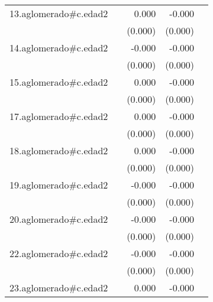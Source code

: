 {\begin{longtable}{l*{4}{D{.}{.}{-1}}}
\addlinespace
13.aglomerado#c.edad2&                     &       0.000         &      -0.000         &                     \\
            &                     &     (0.000)         &     (0.000)         &                     \\
\addlinespace
14.aglomerado#c.edad2&                     &      -0.000         &      -0.000\sym{**} &                     \\
            &                     &     (0.000)         &     (0.000)         &                     \\
\addlinespace
15.aglomerado#c.edad2&                     &       0.000         &      -0.000         &                     \\
            &                     &     (0.000)         &     (0.000)         &                     \\
\addlinespace
17.aglomerado#c.edad2&                     &       0.000         &      -0.000         &                     \\
            &                     &     (0.000)         &     (0.000)         &                     \\
\addlinespace
18.aglomerado#c.edad2&                     &       0.000         &      -0.000         &                     \\
            &                     &     (0.000)         &     (0.000)         &                     \\
\addlinespace
19.aglomerado#c.edad2&                     &      -0.000         &      -0.000         &                     \\
            &                     &     (0.000)         &     (0.000)         &                     \\
\addlinespace
20.aglomerado#c.edad2&                     &      -0.000         &      -0.000         &                     \\
            &                     &     (0.000)         &     (0.000)         &                     \\
\addlinespace
22.aglomerado#c.edad2&                     &      -0.000         &      -0.000\sym{*}  &                     \\
            &                     &     (0.000)         &     (0.000)         &                     \\
\addlinespace
23.aglomerado#c.edad2&                     &       0.000         &      -0.000\sym{*}  &                     \\

\end{longtable}}
